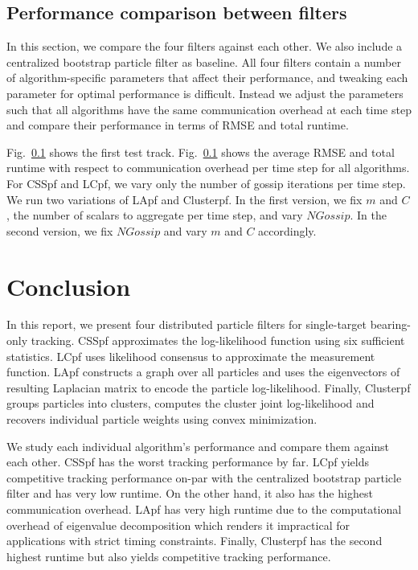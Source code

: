 \documentclass[10pt,letterpaper,final]{article}
\begin{document}
\subsection{Performance comparison between filters}
In this section, we compare the four filters against each other. We also include a centralized bootstrap particle filter as baseline. All four filters contain a number of algorithm-specific parameters that affect their performance, and tweaking each parameter for optimal performance is difficult. Instead we adjust the parameters such that all algorithms have the same communication overhead at each time step and compare their performance in terms of RMSE and total runtime. 

Fig.~\ref{} shows the first test track. Fig.~\ref{} shows the average RMSE and total runtime with respect to communication overhead per time step for all algorithms. For CSSpf and LCpf, we vary only the number of gossip iterations per time step. We run two variations of LApf and Clusterpf. In the first version, we fix $m$ and $C$, the number of scalars to aggregate per time step, and vary $NGossip$. In the second version, we fix $NGossip$ and vary $m$ and $C$ accordingly. 

\section{Conclusion}
\label{sec:conclusion}
In this report, we present four distributed particle filters for single-target bearing-only tracking. CSSpf approximates the log-likelihood function using six sufficient statistics. LCpf uses likelihood consensus to approximate the measurement function. LApf constructs a graph over all particles and uses the eigenvectors of resulting Laplacian matrix to encode the particle log-likelihood. Finally, Clusterpf groups particles into clusters, computes the cluster joint log-likelihood and recovers individual particle weights using convex minimization. 

We study each individual algorithm's performance and compare them against each other. CSSpf has the worst tracking performance by far. LCpf yields competitive tracking performance on-par with the centralized bootstrap particle filter and has very low runtime. On the other hand, it also has the highest communication overhead. LApf has very high runtime due to the computational overhead of eigenvalue decomposition which renders it impractical for applications with strict timing constraints. Finally, Clusterpf has the second highest runtime but also yields competitive tracking performance. 



\end{document}
